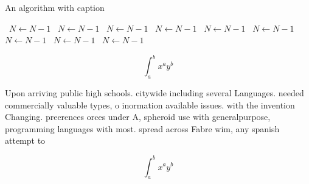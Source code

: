 \documentclass[a4paper]{article}
\begin{document}
\begin{algorithm}
\caption{An algorithm with caption}
\begin{algorithmic}
\    \State $N \gets N - 1$
\    \State $N \gets N - 1$
\    \State $N \gets N - 1$
\    \State $N \gets N - 1$
\    \State $N \gets N - 1$
\    \State $N \gets N - 1$
\    \State $N \gets N - 1$
\    \State $N \gets N - 1$
\    \State $N \gets N - 1$
\EndWhile
\end{algorithmic}
\end{algorithm}

\[ \int_{a}^{b}{x^{a}y^{b}} \]

Upon arriving public high schools. citywide including several Languages. needed commercially valuable types, o inormation available issues. with the invention Changing. preerences orces under A, spheroid use with generalpurpose, programming languages with most. spread across Fabre wim, any spanish attempt to

\[ \int_{a}^{b}{x^{a}y^{b}} \]
\end{document}

